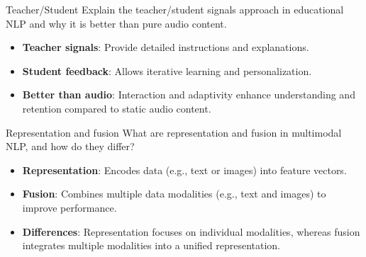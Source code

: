 \documentclass{article}
\begin{document}
\begin{exercise}{Teacher/Student}
  Explain the teacher/student signals approach in educational NLP and why it is better than pure audio content.

  \begin{solution}
    \begin{itemize}
        \item \textbf{Teacher signals}: Provide detailed instructions and explanations.
        \item \textbf{Student feedback}: Allows iterative learning and personalization.
        \item \textbf{Better than audio}: Interaction and adaptivity enhance understanding and retention compared to static audio content.
    \end{itemize}
  \end{solution}
\end{exercise}

\begin{exercise}{Representation and fusion}
  What are representation and fusion in multimodal NLP, and how do they differ?

  \begin{solution}
    \begin{itemize}
        \item \textbf{Representation}: Encodes data (e.g., text or images) into feature vectors.
        \item \textbf{Fusion}: Combines multiple data modalities (e.g., text and images) to improve performance.
        \item \textbf{Differences}: Representation focuses on individual modalities, whereas fusion integrates multiple modalities into a unified representation.
    \end{itemize}
  \end{solution}
\end{exercise}
\end{document}
